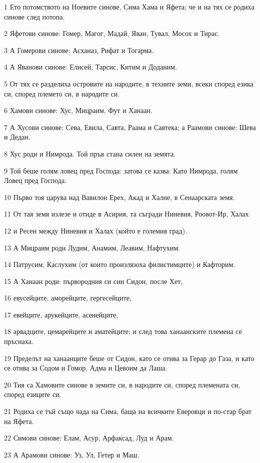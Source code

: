 \par 1 Ето потомството на Ноевите синове, Сима Хама и Яфета; че и на тях се родиха синове след потопа.
\par 2 Яфетови синове: Гомер, Магог, Мадай, Яван, Тувал, Мосох и Тирас.
\par 3 А Гомерови синове: Асханаз, Рифат и Тогарма.
\par 4 А Яванови синове: Елисей, Тарсис, Китим и Доданим.
\par 5 От тях се разделиха островите на народите, в техните земи, всеки според езика си, според племето си, в народите си.
\par 6 Хамови синове: Хус, Мицраим, Фут и Ханаан.
\par 7 А Хусови синове: Сева, Евила, Савта, Раама и Савтека; а Раамови синове: Шева и Дедан.
\par 8 Хус роди и Нимрода. Той пръв стана силен на земята.
\par 9 Той беше голям ловец пред Господа: затова се казва: Като Нимрода, голям Ловец пред Господа.
\par 10 Първо тоя царува над Вавилон Ерех, Акад и Халне, в Сенаарската земя.
\par 11 От тая земя излезе и отиде в Асирия, та съгради Ниневия, Роовот-Ир, Халах
\par 12 и Ресен между Ниневия и Халах (който е големия град).
\par 13 А Мицраим роди Лудим, Анамим, Леавим, Нафтухим.
\par 14 Патрусим, Каслухим (от които произлязоха филистимците) и Кафторим.
\par 15 А Ханаан роди: първородния си син Сидон, после Хет,
\par 16 евусейците, аморейците, гергесейците,
\par 17 евейците, арукейците, асенейците,
\par 18 арвадците, цемарейците и аматейците; и след това ханаанските племена се пръснаха.
\par 19 Пределът на ханаанците беше от Сидон, като се отива за Герар до Газа, и като се отива за Содом и Гомор, Адма и Цевоим да Лаша.
\par 20 Тия са Хамовите синове в земите си, в народите си, според племената си, според езиците си.
\par 21 Родиха се тъй също чада на Сима, баща на всичките Еверовци и по-стар брат на Яфета.
\par 22 Симови синове: Елам, Асур, Арфаксад, Луд и Арам.
\par 23 А Арамови синове: Уз, Ул, Гетер и Маш.
